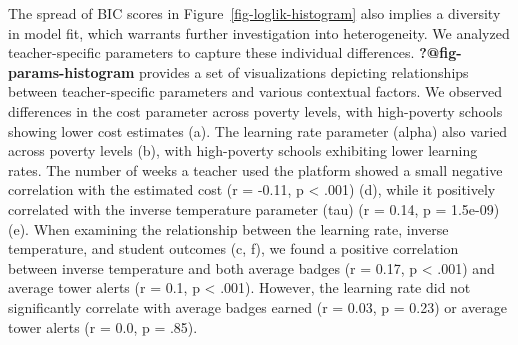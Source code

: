 \documentclass[
  number,
  preprint,
  3p,
  onecolumn]{elsarticle}
\begin{document}
The spread of BIC scores in Figure~\ref{fig-loglik-histogram} also
implies a diversity in model fit, which warrants further investigation
into heterogeneity. We analyzed teacher-specific parameters to capture
these individual differences. \textbf{?@fig-params-histogram} provides a
set of visualizations depicting relationships between teacher-specific
parameters and various contextual factors. We observed differences in
the cost parameter across poverty levels, with high-poverty schools
showing lower cost estimates (a). The learning rate parameter (alpha)
also varied across poverty levels (b), with high-poverty schools
exhibiting lower learning rates. The number of weeks a teacher used the
platform showed a small negative correlation with the estimated cost (r
= -0.11, p \textless{} .001) (d), while it positively correlated with
the inverse temperature parameter (tau) (r = 0.14, p = 1.5e-09) (e).
When examining the relationship between the learning rate, inverse
temperature, and student outcomes (c, f), we found a positive
correlation between inverse temperature and both average badges (r =
0.17, p \textless{} .001) and average tower alerts (r = 0.1, p
\textless{} .001). However, the learning rate did not significantly
correlate with average badges earned (r = 0.03, p = 0.23) or average
tower alerts (r = 0.0, p = .85).
\end{document}
